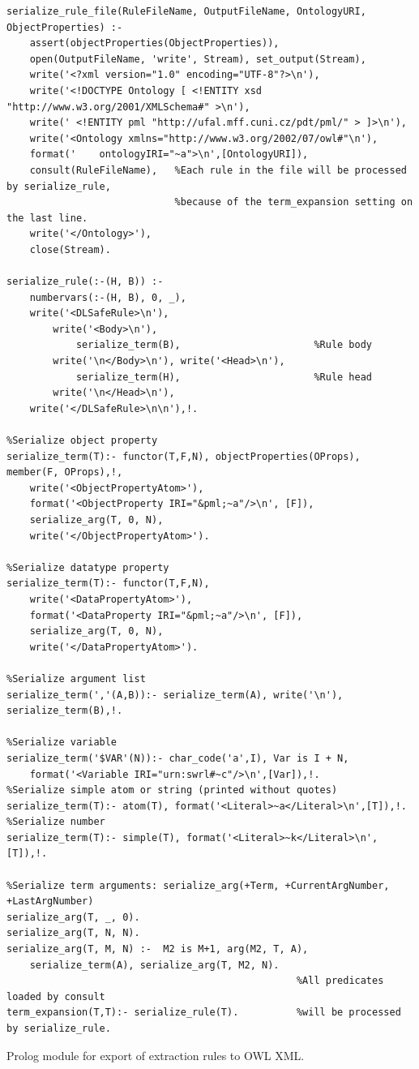 

\begin{listing}[ht]
\begin{verbatim}
serialize_rule_file(RuleFileName, OutputFileName, OntologyURI, ObjectProperties) :-
	assert(objectProperties(ObjectProperties)),
	open(OutputFileName, 'write', Stream), set_output(Stream),
	write('<?xml version="1.0" encoding="UTF-8"?>\n'),
	write('<!DOCTYPE Ontology [ <!ENTITY xsd "http://www.w3.org/2001/XMLSchema#" >\n'),
	write('	<!ENTITY pml "http://ufal.mff.cuni.cz/pdt/pml/" > ]>\n'),		
	write('<Ontology xmlns="http://www.w3.org/2002/07/owl#"\n'),	
	format('	ontologyIRI="~a">\n',[OntologyURI]),
	consult(RuleFileName),   %Each rule in the file will be processed by serialize_rule,
	                         %because of the term_expansion setting on the last line. 	                         
	write('</Ontology>'),			
	close(Stream).

serialize_rule(:-(H, B)) :- 	
	numbervars(:-(H, B), 0, _),	
	write('<DLSafeRule>\n'),		
		write('<Body>\n'),          
			serialize_term(B),                       %Rule body
		write('\n</Body>\n'), write('<Head>\n'),
			serialize_term(H),                       %Rule head
		write('\n</Head>\n'),			
	write('</DLSafeRule>\n\n'),!.
	 
%Serialize object property
serialize_term(T):- functor(T,F,N), objectProperties(OProps), member(F, OProps),!,	
	write('<ObjectPropertyAtom>'),
	format('<ObjectProperty IRI="&pml;~a"/>\n', [F]),
	serialize_arg(T, 0, N),		
	write('</ObjectPropertyAtom>').

%Serialize datatype property
serialize_term(T):- functor(T,F,N),	
	write('<DataPropertyAtom>'),
	format('<DataProperty IRI="&pml;~a"/>\n', [F]),
	serialize_arg(T, 0, N),		
	write('</DataPropertyAtom>').

%Serialize argument list
serialize_term(','(A,B)):- serialize_term(A), write('\n'), serialize_term(B),!.

%Serialize variable
serialize_term('$VAR'(N)):- char_code('a',I), Var is I + N,
	format('<Variable IRI="urn:swrl#~c"/>\n',[Var]),!.
%Serialize simple atom or string (printed without quotes)
serialize_term(T):- atom(T), format('<Literal>~a</Literal>\n',[T]),!.
%Serialize number
serialize_term(T):- simple(T), format('<Literal>~k</Literal>\n',[T]),!.

%Serialize term arguments: serialize_arg(+Term, +CurrentArgNumber, +LastArgNumber)
serialize_arg(T, _, 0).
serialize_arg(T, N, N).
serialize_arg(T, M, N) :-  M2 is M+1, arg(M2, T, A),
	serialize_term(A), serialize_arg(T, M2, N).  
                                                  %All predicates loaded by consult
term_expansion(T,T):- serialize_rule(T).          %will be processed by serialize_rule.
\end{verbatim}
\caption{Prolog module for export of extraction rules to OWL XML.}
\label{lst:rules_export}
\end{listing}


